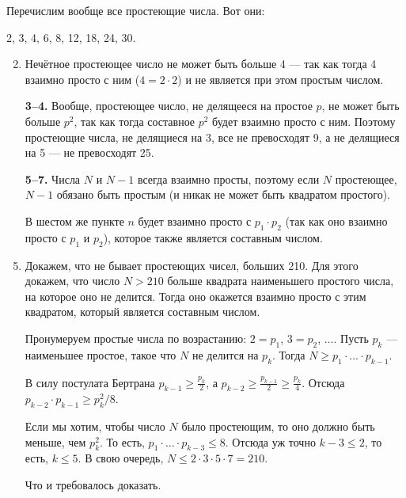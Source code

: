 \def\lne{\medskip \\ \rule{0.65\textwidth}{0.028cm}}


\noindent Перечислим вообще все простеющие числа. Вот они:

\begin{center}
	2, 3, 4, 6, 8, 12, 18, 24, 30.
\end{center}

\begin{enumerate} \setcounter{enumi}{1}
	\item Нечётное простеющее число не может быть больше 4 — так как тогда 4 взаимно просто с ним ($4 = 2 \cdot 2$) и не является при этом простым числом.
	\item[\bfseries 3–4.] \setcounter{enumi}{4} Вообще, простеющее число, не делящееся на простое $p$, не может быть больше $p^2$, так как тогда составное $p^2$ будет взаимно просто с ним. Поэтому простеющие числа, не делящиеся на 3, все не превосходят 9, а не делящиеся на 5 — не превосходят 25.
	\item[\bfseries 5–7.] \setcounter{enumi}{7} Числа $N$ и $N-1$ всегда взаимно просты, поэтому если $N$ простеющее, $N-1$ обязано быть простым (и никак не может быть квадратом простого).

	В шестом же пункте $n$ будет взаимно просто с $p_1 \cdot p_2$ (так как оно взаимно просто с $p_1$ и $p_2$), которое также является составным числом.
	
	\item Докажем, что не бывает простеющих чисел, больших 210. Для этого докажем, что число $N >210$ больше квадрата наименьшего простого числа, на которое оно не делится. Тогда оно окажется взаимно просто с этим квадратом, который является составным числом.
	
	Пронумеруем простые числа по возрастанию: $2 = p_1$, $3 = p_2$, $\ldots$. Пусть $p_k$ — наименьшее простое, такое что $N$ не делится на $p_k$. Тогда $N \geq p_1 \cdot \ldots \cdot p_{k-1}$.
	
	В силу постулата Бертрана $p_{k-1} \ge \tfrac{p_k}{2}$, а $p_{k-2} \ge \tfrac{p_{k-1}}{2} \ge \tfrac{p_k}{4}$. Отсюда $p_{k-2} \cdot p_{k-1} \ge p_k^2 / 8$.
	
	Если мы хотим, чтобы число $N$ было простеющим, то оно должно быть меньше, чем $p_k^2$. То есть, $p_1 \cdot \ldots \cdot p_{k-3} \le 8$. Отсюда уж точно $k-3 \le 2$, то есть, $k \le 5$. В свою очередь, $N \le 2 \cdot 3 \cdot 5 \cdot 7 = 210$.

	Что и требовалось доказать.
\end{enumerate}